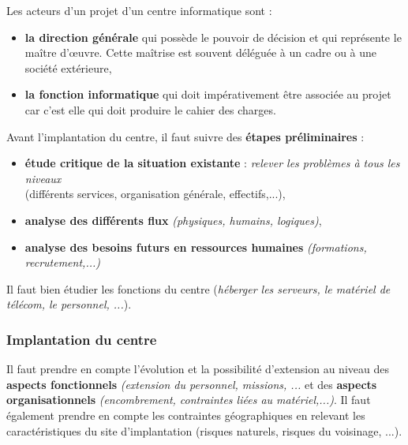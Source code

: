 \documentclass[10pt,a4paper,oneside,titlepage]{report}
\newcommand{\titre}[1]{\textcolor{title}{#1}}
\newcommand{\strong}[1]{\textbf{\titre{#1}}}
\begin{document}
\begin{sffamily}
\noindent Les acteurs d'un projet d'un centre informatique sont :
\begin{itemize}
\item \strong{la direction générale} qui possède le pouvoir de décision et qui représente le maître d'\oe uvre. Cette maîtrise est souvent déléguée à un cadre ou à une 
société extérieure,
\item \strong{la fonction informatique} qui doit impérativement \^etre associée au projet car c'est elle qui doit produire le cahier des charges. \\
\end{itemize}

\noindent Avant l'implantation du centre, il faut suivre des \strong{étapes préliminaires} :
\begin{itemize}
\item \strong{étude critique de la situation existante} : \textit{relever les problèmes à tous les niveaux}\\(différents services, organisation générale, effectifs,...),
\item \strong{analyse des différents flux} \textit{(physiques, humains, logiques)},
\item \strong{analyse des besoins futurs en ressources humaines} \textit{(formations, recrutement,...)}
\end{itemize}

Il faut bien étudier les fonctions du centre (\textit{héberger les serveurs, le matériel de télécom, le personnel, ...}).

\subsubsection{Implantation du centre}

Il faut prendre en compte l'évolution et la possibilité d'extension au niveau des \strong{aspects fonctionnels} \textit{(extension du personnel, missions, ...} et des \strong{aspects organisationnels} \textit{(encombrement, contraintes liées au 
matériel,...)}. Il faut également prendre en compte les contraintes géographiques en relevant les caractéristiques du site d'implantation (risques naturels, risques du voisinage, ...). \\


\end{sffamily}
\end{document}
